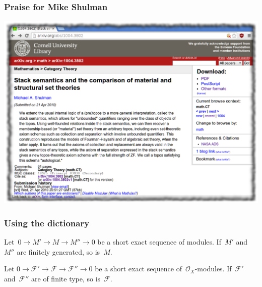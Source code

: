 \documentclass[12pt,utf8,notheorems,compress,t]{beamer}
\newcommand{\F}{\mathcal{F}}
\renewcommand{\O}{\mathcal{O}}
\renewcommand{\_}{\mathpunct{.}}
\newcommand{\?}{\,{:}\,}
\begin{document}
\begin{frame}[c]\frametitle{Praise for Mike Shulman}
  \centering
  \includegraphics[scale=0.4]{images/mike-shulman-stack-semantics}
  \par
\end{frame}

\begin{frame}\frametitle{Using the dictionary}
  \begin{center}
    \begin{minipage}{0.75\textwidth}
      \begin{exampleblock}{}
        \justifying
        Let~$0 \to M' \to M \to M'' \to 0$ be a short exact sequence of
        modules. If~$M'$ and~$M''$ are finitely generated, so is~$M$.
      \end{exampleblock}
    \end{minipage}
    \medskip

    \scalebox{3}{$\Downarrow$}

    \begin{minipage}{0.75\textwidth}
      \begin{exampleblock}{}
        \justifying
        Let $0 \to \F' \to \F \to \F'' \to 0$ be a short exact sequence
        of~$\O_X$-modules. If~$\F'$ and~$\F''$ are of finite type, so
        is~$\F$.
      \end{exampleblock}
    \end{minipage}
  \end{center}
\end{frame}
\end{document}
